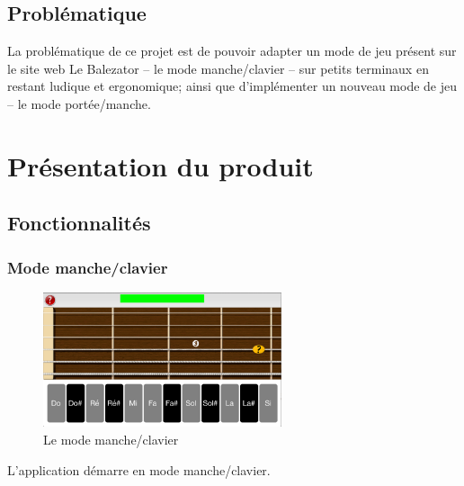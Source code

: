 \documentclass{scrreprt}
\begin{document}
\section{Problématique}

La problématique de ce projet est de pouvoir adapter un mode de jeu présent sur le site web Le Balezator -- le mode manche/clavier -- sur petits terminaux en restant ludique et ergonomique; ainsi que d'implémenter un nouveau mode de jeu -- le mode portée/manche.

\chapter{Présentation du produit}

\section{Fonctionnalités}

\subsection{Mode manche/clavier}


\begin{figure}[!ht]
	\centering\includegraphics[width=7cm]{images/clavier_first_question.png}
     	\caption{Le mode manche/clavier}
\end{figure}


L'application démarre en mode manche/clavier.
\end{document}
